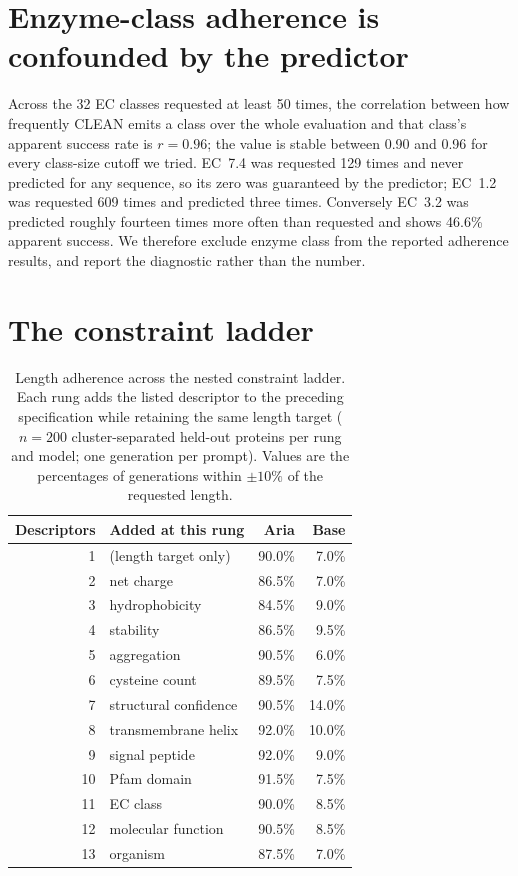 \documentclass{article}
\newcommand{\pct}{\%}
\begin{document}
\section{Enzyme-class adherence is confounded by the predictor}\label{app:ec}
Across the 32 EC classes requested at least 50 times, the correlation between
how frequently CLEAN emits a class over the whole evaluation and that class's
apparent success rate is $r = 0.96$; the value is stable between 0.90 and 0.96
for every class-size cutoff we tried. EC~7.4 was requested 129 times and never
predicted for any sequence, so its zero was guaranteed by the predictor;
EC~1.2 was requested 609 times and predicted three times. Conversely EC~3.2 was
predicted roughly fourteen times more often than requested and shows 46.6\pct{}
apparent success. We therefore exclude enzyme class from the reported adherence results, and report the diagnostic rather than the number.

\section{The constraint ladder}\label{app:ladder}
\begin{table}[b]
\caption{Length adherence across the nested constraint ladder. Each rung adds
the listed descriptor to the preceding specification while retaining the same
length target ($n=200$ cluster-separated held-out proteins per rung and model;
one generation per prompt). Values are the percentages of generations within
$\pm10\pct{}$ of the requested length.}
\label{tab:ladder}
\centering
\small
\begin{tabular}{rlrr}
\toprule
Descriptors & Added at this rung & Aria & Base \\
\midrule
1  & (length target only)  & 90.0\pct & 7.0\pct \\
2  & net charge            & 86.5\pct & 7.0\pct \\
3  & hydrophobicity        & 84.5\pct & 9.0\pct \\
4  & stability             & 86.5\pct & 9.5\pct \\
5  & aggregation           & 90.5\pct & 6.0\pct \\
6  & cysteine count        & 89.5\pct & 7.5\pct \\
7  & structural confidence & 90.5\pct & 14.0\pct \\
8  & transmembrane helix   & 92.0\pct & 10.0\pct \\
9  & signal peptide        & 92.0\pct & 9.0\pct \\
10 & Pfam domain           & 91.5\pct & 7.5\pct \\
11 & EC class              & 90.0\pct & 8.5\pct \\
12 & molecular function    & 90.5\pct & 8.5\pct \\
13 & organism              & 87.5\pct & 7.0\pct \\
\bottomrule
\end{tabular}
\end{table}
\end{document}
